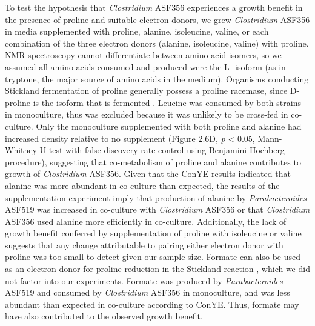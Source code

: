 \documentclass[11pt,twocolumn,notitlepage,openany,twoside]{book}
\begin{document}
\begin{refsection}
To test the hypothesis that \textit{Clostridium} ASF356 experiences a growth benefit in the presence of proline and suitable electron donors, we grew \textit{Clostridium} ASF356 in media supplemented with proline, alanine, isoleucine, valine, or each combination of the three electron donors (alanine, isoleucine, valine) with proline. NMR spectroscopy cannot differentiate between amino acid isomers, so we assumed all amino acids consumed and produced were the L- isoform (as in tryptone, the major source of amino acids in the medium). Organisms conducting Stickland fermentation of proline generally possess a proline racemase, since D-proline is the isoform that is fermented \cite{Watanabe2015-wa}. Leucine was consumed by both strains in monoculture, thus was excluded because it was unlikely to be cross-fed in co-culture. Only the monoculture supplemented with both proline and alanine had increased density relative to no supplement (Figure 2.6D, \textit{p} < 0.05, Mann-Whitney U-test with false discovery rate control using Benjamini-Hochberg procedure), suggesting that co-metabolism of proline and alanine contributes to growth of \textit{Clostridium} ASF356. Given that the ConYE results indicated that alanine was more abundant in co-culture than expected, the results of the supplementation experiment imply that production of alanine by \textit{Parabacteroides} ASF519 was increased in co-culture with \textit{Clostridium} ASF356 or that \textit{Clostridium} ASF356 used alanine more efficiently in co-culture. Additionally, the lack of growth benefit conferred by supplementation of proline with isoleucine or valine suggests that any change attributable to pairing either electron donor with proline was too small to detect given our sample size. Formate can also be used as an electron donor for proline reduction in the Stickland reaction \cite{Kabisch1999-jf}, which we did not factor into our experiments. Formate was produced by \textit{Parabacteroides} ASF519 and consumed by \textit{Clostridium} ASF356 in monoculture, and was less abundant than expected in co-culture according to ConYE. Thus, formate may have also contributed to the observed growth benefit.


\end{refsection}
\end{document}
